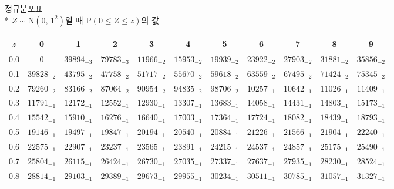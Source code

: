 \documentclass[10pt, a4paper]{article}
\begin{document}
\begin{center}
    \huge{정규분포표}\normalsize\\
    * \(Z \sim \mathrm{N}\left(0,\,1^{2}\right)\)일 때 \(\mathrm{P}\left(0 \leq Z \leq z\right)\)의 값 
    \begin{longtable}{c || c c c c c | c c c c c}
        \(z\) & 0 & 1 & 2 & 3 & 4 & 5 & 6 & 7 & 8 & 9\\
        \hline\hline
        0.0 & \({0}\) & \({39894}_{-3}\) & \({79783}_{-3}\) & \({11966}_{-2}\) & \({15953}_{-2}\) & \({19939}_{-2}\) & \({23922}_{-2}\) & \({27903}_{-2}\) & \({31881}_{-2}\) & \({35856}_{-2}\)\\
        0.1 & \({39828}_{-2}\) & \({43795}_{-2}\) & \({47758}_{-2}\) & \({51717}_{-2}\) & \({55670}_{-2}\) & \({59618}_{-2}\) & \({63559}_{-2}\) & \({67495}_{-2}\) & \({71424}_{-2}\) & \({75345}_{-2}\)\\
        0.2 & \({79260}_{-2}\) & \({83166}_{-2}\) & \({87064}_{-2}\) & \({90954}_{-2}\) & \({94835}_{-2}\) & \({98706}_{-2}\) & \({10257}_{-1}\) & \({10642}_{-1}\) & \({11026}_{-1}\) & \({11409}_{-1}\)\\
        0.3 & \({11791}_{-1}\) & \({12172}_{-1}\) & \({12552}_{-1}\) & \({12930}_{-1}\) & \({13307}_{-1}\) & \({13683}_{-1}\) & \({14058}_{-1}\) & \({14431}_{-1}\) & \({14803}_{-1}\) & \({15173}_{-1}\)\\
        0.4 & \({15542}_{-1}\) & \({15910}_{-1}\) & \({16276}_{-1}\) & \({16640}_{-1}\) & \({17003}_{-1}\) & \({17364}_{-1}\) & \({17724}_{-1}\) & \({18082}_{-1}\) & \({18439}_{-1}\) & \({18793}_{-1}\)\\
        0.5 & \({19146}_{-1}\) & \({19497}_{-1}\) & \({19847}_{-1}\) & \({20194}_{-1}\) & \({20540}_{-1}\) & \({20884}_{-1}\) & \({21226}_{-1}\) & \({21566}_{-1}\) & \({21904}_{-1}\) & \({22240}_{-1}\)\\
        0.6 & \({22575}_{-1}\) & \({22907}_{-1}\) & \({23237}_{-1}\) & \({23565}_{-1}\) & \({23891}_{-1}\) & \({24215}_{-1}\) & \({24537}_{-1}\) & \({24857}_{-1}\) & \({25175}_{-1}\) & \({25490}_{-1}\)\\
        0.7 & \({25804}_{-1}\) & \({26115}_{-1}\) & \({26424}_{-1}\) & \({26730}_{-1}\) & \({27035}_{-1}\) & \({27337}_{-1}\) & \({27637}_{-1}\) & \({27935}_{-1}\) & \({28230}_{-1}\) & \({28524}_{-1}\)\\
        0.8 & \({28814}_{-1}\) & \({29103}_{-1}\) & \({29389}_{-1}\) & \({29673}_{-1}\) & \({29955}_{-1}\) & \({30234}_{-1}\) & \({30511}_{-1}\) & \({30785}_{-1}\) & \({31057}_{-1}\) & \({31327}_{-1}\)\\

\end{longtable}
\end{center}
\end{document}
